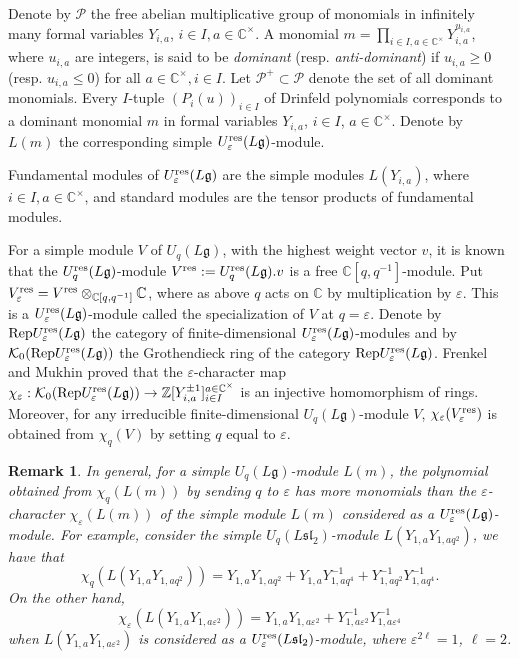 \documentclass[12pt, reqno]{amsart}
\newtheorem{remark}[theorem]{Remark}
\numberwithin{equation}{section}
\newcommand{\res}{{\rm res}}
\begin{document}
Denote by $\mathcal{P}$ the free abelian multiplicative group of monomials in infinitely many formal variables $Y_{i, a}$, $i \in I, a \in \mathbb{C}^{\times}$. A monomial $m=\prod_{i \in I, a \in \mathbb{C}^{\times}} Y_{i, a}^{u_{i, a}}$, where $u_{i, a}$ are integers, is said to be \textit{dominant} (resp. \textit{anti-dominant}) if $u_{i, a} \geq 0$ (resp. $u_{i, a} \leq 0$) for all $a \in \mathbb{C}^{\times}, i \in I$. Let $\mathcal{P}^+ \subset \mathcal{P}$ denote the set of all dominant monomials. Every $I$-tuple $(P_i(u))_{i \in I}$ of Drinfeld polynomials corresponds to a dominant monomial $m$ in formal variables $Y_{i,a}$, $i \in I$, $a \in \mathbb{C}^{\times}$. Denote by $L(m)$ the corresponding simple $U_{\varepsilon}^{\res}(L\mathfrak{g})$-module.


Fundamental modules of $U_\varepsilon^{\res}({L\mathfrak{g}})$ are the simple modules $L(Y_{i,a})$, where $i \in I, a \in \mathbb{C}^{\times}$, and standard modules are the tensor products of fundamental modules.

For a simple module $V$ of $U_q({L\mathfrak{g}})$, with the highest weight vector $v$, it is known \cite[Proposition 2.5]{FM02} that the $U_q^{\res}({L\mathfrak{g}})$-module $V^{\res}:= U_q^{\res}({L\mathfrak{g}}).v$ is a free $\mathbb{C}[q, q^{-1}]$-module. Put $V_\varepsilon^{\res}=V^{\res}\otimes_{\mathbb{C}[q, q^{-1}]}\mathbb{C}$, where as above $q$ acts on $\mathbb{C}$ by multiplication by $\varepsilon$. This is a $U_\varepsilon^{\res}({L\mathfrak{g}})$-module called the specialization of $V$ at $q=\varepsilon$. Denote by ${\rm Rep}U_\varepsilon^{\res}({L\mathfrak{g}})$ the category of finite-dimensional $U_\varepsilon^{\res}({L\mathfrak{g}})$-modules and by $\mathcal{K}_0({\rm Rep}U_\varepsilon^{\res}({L\mathfrak{g}}))$ the Grothendieck ring of the category ${\rm Rep}U_\varepsilon^{\res}({L\mathfrak{g}})$. Frenkel and Mukhin {\cite[Theorem 3.2]{FM02}} proved that the $\varepsilon$-character map $\chi_{\varepsilon}: \mathcal{K}_0({\rm Rep} U_\varepsilon^{\res}({L\mathfrak{g}})) \rightarrow \mathbb{Z}[Y_{i,a}^{\pm1}]_{i\in I}^{a\in\mathbb{C^{\times}}}$ is an injective homomorphism of rings. Moreover, for any irreducible finite-dimensional $U_q(L\mathfrak{g})$-module $V$, $\chi_{\varepsilon}(V_{\varepsilon}^{\res})$ is obtained from $\chi_{q}(V)$ by setting $q$ equal to $\varepsilon$.

\begin{remark}
In general, for a simple $U_q(L\mathfrak{g})$-module $L(m)$, the polynomial obtained from $\chi_q(L(m))$ by sending $q$ to $\varepsilon$ has more monomials than the $\varepsilon$-character $\chi_{\varepsilon}(L(m))$ of the simple module $L(m)$ considered as a $U_\varepsilon^{\res}({L\mathfrak{g}})$-module. For example, consider the simple $U_q(L\mathfrak{sl}_2)$-module $L(Y_{1,a}Y_{1,aq^2})$, we have that
\[
\chi_q(L(Y_{1,a}Y_{1,aq^2})) = Y_{1,a}Y_{1,aq^2}+Y_{1,a}Y_{1,aq^4}^{-1}+Y_{1,aq^2}^{-1}Y_{1,aq^4}^{-1}.
\]
On the other hand,
\[
\chi_{\varepsilon}(L(Y_{1,a}Y_{1,a\varepsilon^2})) =Y_{1,a}Y_{1,a\varepsilon^2}+Y_{1,a\varepsilon^2}^{-1}Y_{1,a\varepsilon^4}^{-1}
\]
when $L(Y_{1,a}Y_{1,a\varepsilon^2})$ is considered as a $U_\varepsilon^{\res}({L\mathfrak{sl}_2})$-module, where $\varepsilon^{2 \ell}=1$, $\ell=2$.
\end{remark}
\end{document}
